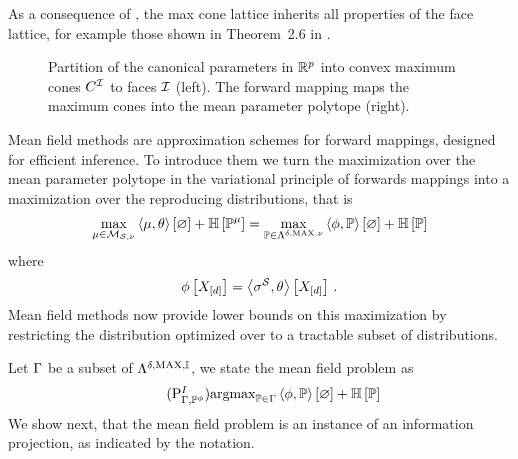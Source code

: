 As a consequence of , the max cone lattice inherits all properties of the face lattice, for example those shown in Theorem~2.6 in \cite{ziegler_lectures_2013}.

\begin{figure}
    \begin{center}
        
    \end{center}
    \caption{
        Partition of the canonical parameters in $\mathbb{R}^{p}$ into convex maximum cones $C^{\mathcal{I}}$ to faces $\mathcal{I}$ (left).
        The forward mapping maps the maximum cones into the mean parameter polytope (right).
    }\label{fig:max_cone_sketch}
\end{figure}


\label{sec:meanField}

Mean field methods are approximation schemes for forward mappings, designed for efficient inference.
To introduce them we turn the maximization over the mean parameter polytope in the variational principle of forwards mappings into a maximization over the reproducing distributions, that is
\begin{align*}
    \max_{\mu\in\mathcal{M}_{\mathcal{S},\nu}}  \left\langle \mu,\theta\right\rangle \left[ \varnothing \right] + \mathbb{H}\left[\mathbb{P}^{\mu}\right]
    =
    \max_{\mathbb{P}\in\Lambda^{\delta,\mathrm{MAX},\nu}} \left\langle \phi,\mathbb{P}\right\rangle \left[ \varnothing \right] + \mathbb{H}\left[\mathbb{P}\right]
\end{align*}
where
\begin{align*}
    \phi\left[X_{[d]}\right] = \left\langle \sigma^{\mathcal{S}},\theta\right\rangle \left[ X_{[d]} \right] \, .
\end{align*}
Mean field methods now provide lower bounds on this maximization by restricting the distribution optimized over to a tractable subset of distributions.

Let $\Gamma$ be a subset of $\Lambda^{\delta,\mathrm{MAX},\mathbb{I}}$, we state the mean field problem as
\begin{align}
    \label{prob:meanField}\tag{$\probtagtypeinst{I}{\probtensorset,\probof{\energytensor}}$}
    \argmax_{\probtensor\in\probtensorset} \contraction{\energytensor,\probtensor} + \sentropyof{\probtensor}
\end{align}
We show next, that the mean field problem is an instance of an information projection, as indicated by the notation.

